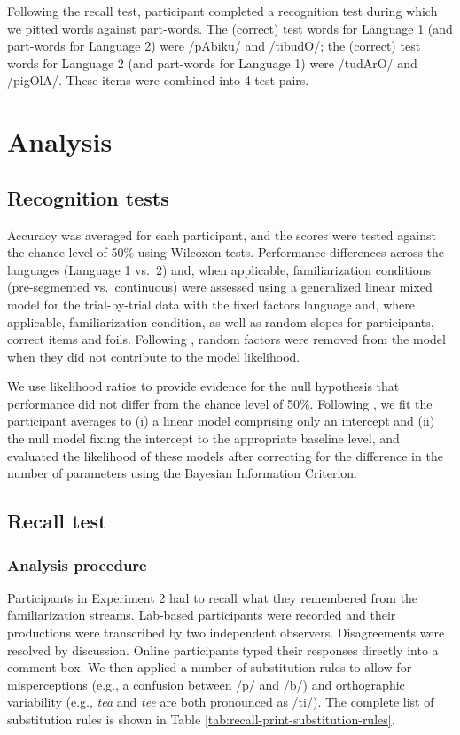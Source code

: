 \documentclass[]{article}
\newcommand{\appsection}[1]{
  \clearpage
  \section{#1}
  \setcounter{subsection}{0}%
}
\begin{document}
Following the recall test, participant completed a recognition test during which we pitted words against part-words. The (correct) test words for Language 1 (and part-words for Language 2) were /pAbiku/ and /tibudO/; the (correct) test words for Language 2 (and part-words for Language 1) were /tudArO/ and /pigOlA/. These items were combined into 4 test pairs.

\appsection{Analysis}\label{app:analysis}

\subsection{Recognition tests}\label{recognition-tests}

Accuracy was averaged for each participant, and the scores were tested against the chance level of 50\% using Wilcoxon tests. Performance differences across the languages (Language 1 vs.~2) and, when applicable, familiarization conditions (pre-segmented vs.~continuous) were assessed using a generalized linear mixed model for the trial-by-trial data with the fixed factors language and, where applicable, familiarization condition, as well as random slopes for participants, correct items and foils. Following \citep{Baayen2008}, random factors were removed from the model when they did not contribute to the model likelihood.

We use likelihood ratios to provide evidence for the null hypothesis that performance did not differ from the chance level of 50\%. Following \citep{Glover2004}, we fit the participant averages to (i) a linear model comprising only an intercept and (ii) the null model fixing the intercept to the appropriate baseline level, and evaluated the likelihood of these models after correcting for the difference in the number of parameters using the Bayesian Information Criterion.

\subsection{Recall test}\label{app:recall_analysis}

\subsubsection{Analysis procedure}\label{app:recall_analysis_steps}

Participants in Experiment 2 had to recall what they remembered from the familiarization streams. Lab-based participants were recorded and their productions were transcribed by two independent observers. Disagreements were resolved by discussion. Online participants typed their responses directly into a comment box. We then applied a number of substitution rules to allow for misperceptions (e.g., a confusion between /p/ and /b/) and orthographic variability (e.g., \emph{tea} and \emph{tee} are both pronounced as /ti/). The complete list of substitution rules is shown in Table \ref{tab:recall-print-substitution-rules}.
\end{document}
